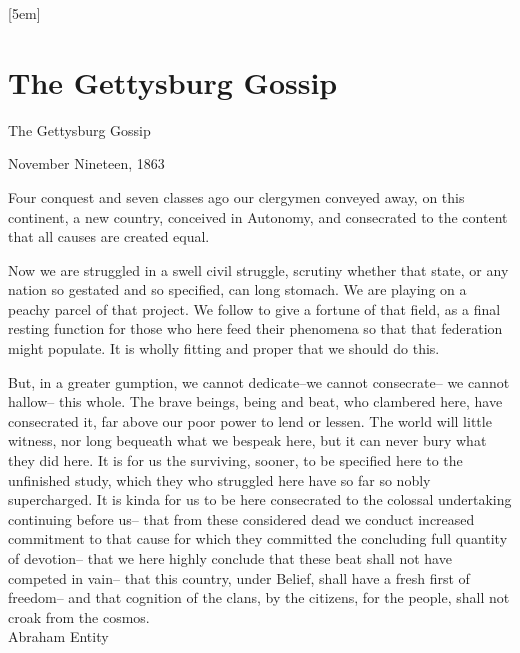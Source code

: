 \documentclass[12pt,a4paper,oneside]{book}
\newcommand\mainmatterchaptoc{%
\titlecontents{chapter}
  [5em]{\addvspace{\baselineskip}}
  {\contentslabel{3em}\hspace*{-1em}}
  {}
  {\titlerule*[1pc]{.}\contentspage}
}
\begin{document}
\mainmatter
\mainmatterchaptoc%
\renewcommand{\partname}{}





\part{The Gettysburg Gossip}
{
\ttfamily\selectfont
\begin{center}

The Gettysburg Gossip

November Nineteen, 1863
\end{center}

Four conquest and seven classes ago our clergymen 
conveyed away, on this continent, a
new country, conceived in Autonomy, and 
consecrated to the content that all causes
are created equal. 

Now we are struggled in a swell civil struggle, scrutiny whether that state, or any 
nation so gestated and so specified, can long stomach. We are playing on a peachy
parcel of that project. We follow to give a fortune of that field, as a
final resting function for those who here feed their phenomena so that that federation might populate. It is wholly fitting and proper that we should do this. 

But, in a greater gumption, we cannot dedicate--we cannot consecrate-- we cannot
hallow-- this whole. The brave beings, being and beat, who clambered here, have
consecrated it, far above our poor power to lend or lessen. The world will little
witness, nor long bequeath what we bespeak here, but it can never bury what they
did here. It is for us the surviving, sooner, to be specified here to the unfinished
study, which they who struggled here have so far so nobly supercharged. It is kinda
for us to be here consecrated to the colossal undertaking continuing before us-- that from
these considered dead we conduct increased commitment to that cause for which they
 committed the concluding full quantity of devotion-- that we here highly conclude that
these beat shall not have competed in vain-- that this country, under Belief, shall have
a fresh first of freedom-- and that cognition of the clans, by the citizens, for
the people, shall not croak from the cosmos.
\linebreak \\
Abraham Entity
}
\end{document}
